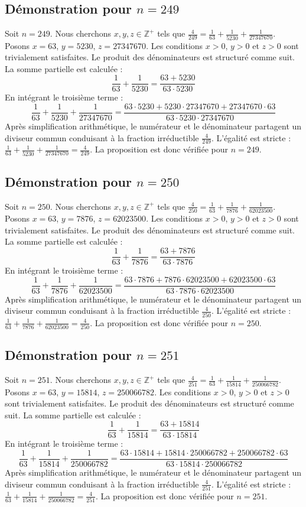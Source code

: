 \documentclass[11pt,a4paper]{article}
\begin{document}
\subsection{Démonstration pour $n = 249$}
Soit $n = 249$. Nous cherchons $x, y, z \in \mathbb{Z}^{+}$ tels que $\frac{4}{249} = \frac{1}{63} + \frac{1}{5230} + \frac{1}{27347670}$.
Posons $x = 63$, $y = 5230$, $z = 27347670$.
Les conditions $x > 0$, $y > 0$ et $z > 0$ sont trivialement satisfaites.
Le produit des dénominateurs est structuré comme suit. La somme partielle est calculée :
$$ \frac{1}{63} + \frac{1}{5230} = \frac{63+5230}{63 \cdot 5230} $$
En intégrant le troisième terme :
$$ \frac{1}{63} + \frac{1}{5230} + \frac{1}{27347670} = \frac{63 \cdot 5230 + 5230 \cdot 27347670 + 27347670 \cdot 63}{63 \cdot 5230 \cdot 27347670} $$
Après simplification arithmétique, le numérateur et le dénominateur partagent un diviseur commun conduisant à la fraction irréductible $\frac{4}{249}$.
L'égalité est stricte : $\frac{1}{63} + \frac{1}{5230} + \frac{1}{27347670} = \frac{4}{249}$.
La proposition est donc vérifiée pour $n = 249$.
\subsection{Démonstration pour $n = 250$}
Soit $n = 250$. Nous cherchons $x, y, z \in \mathbb{Z}^{+}$ tels que $\frac{4}{250} = \frac{1}{63} + \frac{1}{7876} + \frac{1}{62023500}$.
Posons $x = 63$, $y = 7876$, $z = 62023500$.
Les conditions $x > 0$, $y > 0$ et $z > 0$ sont trivialement satisfaites.
Le produit des dénominateurs est structuré comme suit. La somme partielle est calculée :
$$ \frac{1}{63} + \frac{1}{7876} = \frac{63+7876}{63 \cdot 7876} $$
En intégrant le troisième terme :
$$ \frac{1}{63} + \frac{1}{7876} + \frac{1}{62023500} = \frac{63 \cdot 7876 + 7876 \cdot 62023500 + 62023500 \cdot 63}{63 \cdot 7876 \cdot 62023500} $$
Après simplification arithmétique, le numérateur et le dénominateur partagent un diviseur commun conduisant à la fraction irréductible $\frac{4}{250}$.
L'égalité est stricte : $\frac{1}{63} + \frac{1}{7876} + \frac{1}{62023500} = \frac{4}{250}$.
La proposition est donc vérifiée pour $n = 250$.
\subsection{Démonstration pour $n = 251$}
Soit $n = 251$. Nous cherchons $x, y, z \in \mathbb{Z}^{+}$ tels que $\frac{4}{251} = \frac{1}{63} + \frac{1}{15814} + \frac{1}{250066782}$.
Posons $x = 63$, $y = 15814$, $z = 250066782$.
Les conditions $x > 0$, $y > 0$ et $z > 0$ sont trivialement satisfaites.
Le produit des dénominateurs est structuré comme suit. La somme partielle est calculée :
$$ \frac{1}{63} + \frac{1}{15814} = \frac{63+15814}{63 \cdot 15814} $$
En intégrant le troisième terme :
$$ \frac{1}{63} + \frac{1}{15814} + \frac{1}{250066782} = \frac{63 \cdot 15814 + 15814 \cdot 250066782 + 250066782 \cdot 63}{63 \cdot 15814 \cdot 250066782} $$
Après simplification arithmétique, le numérateur et le dénominateur partagent un diviseur commun conduisant à la fraction irréductible $\frac{4}{251}$.
L'égalité est stricte : $\frac{1}{63} + \frac{1}{15814} + \frac{1}{250066782} = \frac{4}{251}$.
La proposition est donc vérifiée pour $n = 251$.
\end{document}
